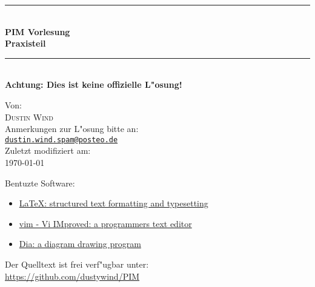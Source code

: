

\newcommand{\TitleHRule}{\rule{\linewidth}{0.5mm}}

\begin{titlepage}
    \begin{center}

    \TitleHRule \\[0.4cm]
    { \huge \bfseries PIM Vorlesung\\Praxisteil\\[0.4cm] }
    \TitleHRule \\[1.5cm]

    \textbf{Achtung: Dies ist keine offizielle L"osung!}

    \vfill
    Von:\\
    \textsc{Dustin Wind}\\

    \vfill
    Anmerkungen zur L"osung bitte an:\\
    \hyperlink{mailto:dustin.wind.spam@posteo.de}{\texttt{dustin.wind.spam@posteo.de}}\\


   \vfill
    Zuletzt modifiziert am:\\
    {\large \today}\\
    \end{center}
    \bigskip

    {\small
    \noindent
    Bentuzte Software:
    \begin{itemize}
        \item \href{http://www.latex-project.org}{\LaTeX{}: structured text formatting and typesetting}
        \item \href{http://www.vim.org}{vim - Vi IMproved: a programmers text editor}
        \item \href{https://wiki.gnome.org/Apps/Dia/}{Dia: a diagram drawing program}
    \end{itemize}
    \noindent
    Der Quelltext ist frei verf"ugbar unter:\\
    \url{https://github.com/dustywind/PIM}
    }

\end{titlepage}

